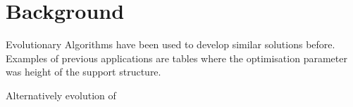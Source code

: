 \section{Background}
Evolutionary Algorithms have been used to develop similar solutions before. Examples of previous  applications are tables where the optimisation parameter was height of the support structure. 

Alternatively evolution of 
